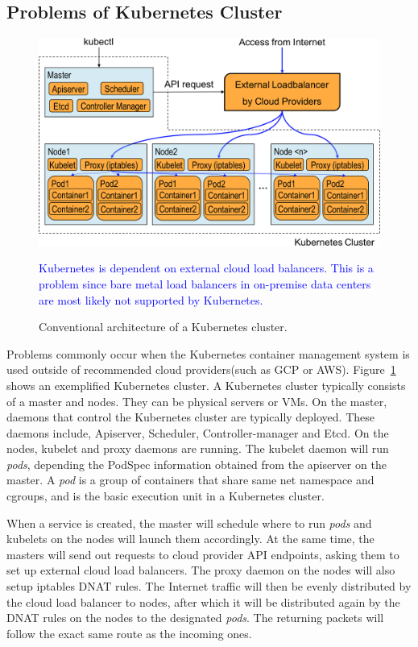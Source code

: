 \subsection{Problems of Kubernetes Cluster}

\begin{figure}[tb]
\includegraphics[width=\columnwidth]{Figs/K8sConventional}
\caption{Conventional architecture of a Kubernetes cluster.}
\textcolor{blue}{
  Kubernetes is dependent on external cloud load balancers.
This is a problem since bare metal load balancers in on-premise data centers are most likely not supported by Kubernetes.
}
\label{fig:K8sConventional}
\end{figure}

Problems commonly occur when the Kubernetes container management system is used outside of recommended cloud providers(such as GCP or AWS).
Figure~\ref{fig:K8sConventional} shows an exemplified Kubernetes cluster.
A Kubernetes cluster typically consists of a master and nodes. They can be physical servers or VMs.
On the master, daemons that control the Kubernetes cluster are typically deployed. 
These daemons include, Apiserver, Scheduler, Controller-manager and Etcd. 
On the nodes, kubelet and proxy daemons are running.
The kubelet daemon will run {\it pods}, depending the PodSpec information obtained from the apiserver on the master.
A {\em pod} is a group of containers that share same net namespace and cgroups, 
and is the basic execution unit in a Kubernetes cluster.

When a service is created, the master will schedule where to run {\em pods} and kubelets on the nodes will launch them accordingly.
At the same time, the masters will send out requests to cloud provider API endpoints, asking them to set up external cloud load balancers.
The proxy daemon on the nodes will also setup iptables DNAT\cite{MartinA.Brown2017} rules. 
The Internet traffic will then be evenly distributed by the cloud load balancer to nodes, 
after which it will be distributed again by the DNAT rules on the nodes to the designated {\em pods}. 
The returning packets will follow the exact same route as the incoming ones.

